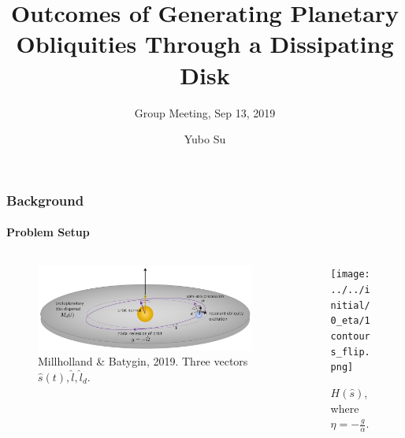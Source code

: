 \documentclass[dvipsnames]{beamer}
\begin{document}
\title[Dissipating Disk]{Outcomes of Generating Planetary Obliquities Through a Dissipating Disk}
\subtitle{Group Meeting, Sep 13, 2019}
\author{Yubo Su}

\maketitle

\begin{frame}
    \frametitle{Background}
    \framesubtitle{Problem Setup}

    \begin{columns}
        \begin{column}{0.5\textwidth}
            \begin{figure}[t]
                \centering
                \includegraphics[width=\textwidth]{1millholland_disk.png}
                \caption{Millholland \& Batygin, 2019. Three vectors
                $\hat{s}(t), \hat{l}, \hat{l}_d$.}
            \end{figure}
        \end{column}
        \begin{column}{0.5\textwidth}
            \begin{figure}[t]
                \centering
                \texttt{[image: ../../initial/0\_eta/1contours\_flip.png]}
                \caption{$H(\hat{s})$, where $\eta = -\frac{g}{\alpha}$.}
            \end{figure}
        \end{column}
    \end{columns}
\end{frame}
\end{document}
